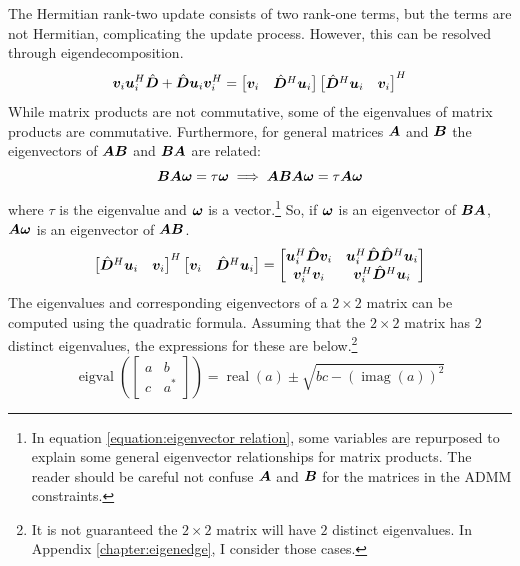 The Hermitian rank-two update consists of two rank-one terms, but the terms are not Hermitian, complicating the update process. However, this can be resolved through eigendecomposition.  
%
\begin{equation}
\bm{v}_{i}\bm{u}_{i}^H \hat{\bm{D}} + \hat{\bm{D}}\bm{u}_{i}\bm{v}_{i}^H = \begin{bmatrix}
\bm{v}_{i} & \hat{\bm{D}}^H\bm{u}_{i} 
\end{bmatrix}
\begin{bmatrix}
\hat{\bm{D}}^H\bm{u}_{i} & \bm{v}_{i}
\end{bmatrix}^H
\end{equation}
%
While matrix products are not commutative, some of the eigenvalues of matrix products are commutative.  Furthermore, for general matrices $\bm{A}$ and $\bm{B}$ the eigenvectors of $\bm{A}\bm{B}$ and $\bm{B}\bm{A}$ are related:
%
\begin{equation}
\bm{B}\bm{A}\bm{\omega} = \tau\bm{\omega}  \implies  \bm{A}\bm{B}\bm{A}\bm{\omega} = \tau\bm{A}\bm{\omega} \label{equation:eigenvector relation}
\end{equation}
%
where $\tau$ is the eigenvalue and $\bm{\omega}$ is a vector.\footnote{In equation \ref{equation:eigenvector relation}, some variables are repurposed to explain some general eigenvector relationships for matrix products. The reader should be careful not confuse $\bm{A}$ and $\bm{B}$ for the matrices in the ADMM constraints.}  So, if $\bm{\omega}$ is an eigenvector of $\bm{B}\bm{A}$, $\bm{A}\bm{\omega}$ is an eigenvector of $\bm{A}\bm{B}$.
%
%
\begin{equation}
\begin{bmatrix}
\hat{\bm{D}}^H\bm{u}_{i} & \bm{v}_{i}
\end{bmatrix}^H
\begin{bmatrix}
\bm{v}_{i} & \hat{\bm{D}}^H\bm{u}_{i} 
\end{bmatrix}
 = 
\begin{bmatrix}
\bm{u}_{i}^H\hat{\bm{D}}\bm{v}_{i} & \bm{u}_{i}^H\hat{\bm{D}}\hat{\bm{D}}^H\bm{u}_{i} \\
\bm{v}_{i}^H\bm{v}_{i}    & \bm{v}_{i}^H\hat{\bm{D}}^H\bm{u}_{i}
\end{bmatrix}
\end{equation}
%
The eigenvalues and corresponding eigenvectors of a $2 \times 2$ matrix can be computed using the quadratic formula. Assuming that the $2 \times 2$ matrix has $2$ distinct eigenvalues, the expressions for these are below.\footnote{It is not guaranteed the $2 \times 2$ matrix will have $2$ distinct eigenvalues. In Appendix \ref{chapter:eigenedge}, I consider those cases.}
%
\begin{equation}
\operatorname{eigval}\left(\begin{bmatrix} a & b \\ c & a^* \end{bmatrix}\right) = \operatorname{real}(a) \pm \sqrt{bc - (\operatorname{imag}(a))^2}
\end{equation}
